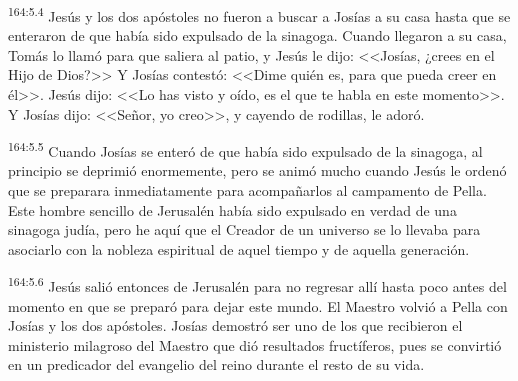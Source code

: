 \par 
\textsuperscript{164:5.4} Jesús y los dos apóstoles no fueron a buscar a Josías a su casa hasta que se enteraron de que había sido expulsado de la sinagoga. Cuando llegaron a su casa, Tomás lo llamó para que saliera al patio, y Jesús le dijo: <<Josías, ¿crees en el Hijo de Dios?>> Y Josías contestó: <<Dime quién es, para que pueda creer en él>>. Jesús dijo: <<Lo has visto y oído, es el que te habla en este momento>>. Y Josías dijo: <<Señor, yo creo>>, y cayendo de rodillas, le adoró.

\par 
\textsuperscript{164:5.5} Cuando Josías se enteró de que había sido expulsado de la sinagoga, al principio se deprimió enormemente, pero se animó mucho cuando Jesús le ordenó que se preparara inmediatamente para acompañarlos al campamento de Pella. Este hombre sencillo de Jerusalén había sido expulsado en verdad de una sinagoga judía, pero he aquí que el Creador de un universo se lo llevaba para asociarlo con la nobleza espiritual de aquel tiempo y de aquella generación.

\par 
\textsuperscript{164:5.6} Jesús salió entonces de Jerusalén para no regresar allí hasta poco antes del momento en que se preparó para dejar este mundo. El Maestro volvió a Pella con Josías y los dos apóstoles. Josías demostró ser uno de los que recibieron el ministerio milagroso del Maestro que dió resultados fructíferos, pues se convirtió en un predicador del evangelio del reino durante el resto de su vida.